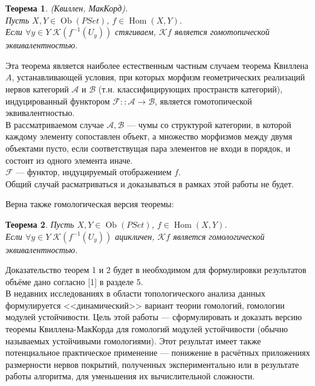 \documentclass[a4paper,12pt]{report}
\newtheorem{theorem}{Теорема}
\begin{document}
\begin{theorem}
  \textit{(Квиллен, МакКорд)}.\\
  Пусть $X, Y \in \operatorname{Ob}(PSet)$, $f \in \operatorname{Hom}(X,Y)$.\\
  Если $\forall y \in Y\;\mathcal{K}(f^{-1}(U_y))$ стягиваем, $\mathcal{K}f$ является гомотопической эквивалентностью.\\
\end{theorem}

\begin{itshape}
Эта теорема является наиболее естественным частным случаем теорема Квиллена $A$, устанавливающей условия, при которых морфизм геометрических реализаций нервов категорий $\mathcal{A}$ и $\mathcal{B}$ (т.н. классифицирующих пространств категорий), индуцированный функтором $\mathcal{F} :: \mathcal{A} \to \mathcal{B}$, является гомотопической эквивалентностью.\\

В рассматриваемом случае $\mathcal{A}, \mathcal{B}$ --- чумы со структурой категории, в которой каждому элементу сопоставлен объект, а множество морфизмов между двумя объектами пусто, если соответствущая пара элементов не входи в порядок, и состоит из одного элемента иначе.\\
$\mathcal{F}$ --- функтор, индуцируемый отображением $f$.\\
Общий случай расматриваться и доказываться в рамках этой работы не будет.
\end{itshape}

Верна также гомологическая версия теоремы:
\begin{theorem}
  Пусть $X, Y \in \operatorname{Ob}(PSet)$, $f \in \operatorname{Hom}(X,Y)$.\\
  Если $\forall y \in Y\;\mathcal{K}(f^{-1}(U_y))$ ацикличен, $\mathcal{K}f$ является гомологической эквивалентностью.\\
\end{theorem}

Доказательство теорем 1 и 2 будет в необходимом для формулировки результатов объёме дано согласно [1] в разделе 5.\\

В недавних исследованиях в области топологического анализа данных формулируется <<динамический>> вариант теории гомологий, гомологии модулей устойчивости. Цель этой работы --- сформулировать и доказать версию теоремы Квиллена-МакКорда для гомологий модулей устойчивости (обычно называемых устойчивыми гомологиями). Этот результат имеет также потенциальное практическое применение --- понижение в расчётных приложениях размерности нервов покрытий, полученных экспериментально или в результате работы алгоритма, для уменьшения их вычислительной сложности.
\end{document}
